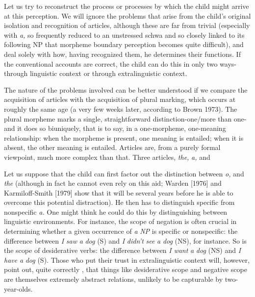Let us try to reconstruct the process or processes by which the child might arrive at this perception. We will ignore the problems that arise from the child's original isolation and recognition of articles, although these are far from trivial (especially with \textit{a,} so frequently reduced to an unstressed schwa and so closely linked to its following NP that morpheme boundary perception becomes quite difficult), and deal solely with how, having recognized them, he determines their functions. If the conventional accounts are correct, the child can do this in only two ways-through linguistic context or through extralinguistic context.

The nature of the problems involved can be better understood if we compare the acquisition of articles with the acquisition of plural marking, which occurs at roughly the same age (a very few weeks later, according to Brown 1973). The plural morpheme marks a single, straightforward distinction-one/more than one-and it does so bi\-uniquely, that is to say, in a one-morpheme, one-meaning relationship: when the morpheme is present, one meaning is entailed; when it is absent, the other meaning is entailed. Articles are, from a purely formal viewpoint, much more complex than that. Three articles, \textit{the,} \textit{a,} and


Let us suppose that the child can first factor out the distinction between \textit{o,} and \textit{the} (although in fact he cannot even rely on this aid; Warden [1976] and Karmiloff-Smith [1979] show that it will be several years before he is able to overcome this potential distraction). He then has to distinguish specific from nonspecific \textit{a. }One might think he could do this by distinguishing between linguistic environ\-ments. For instance, the scope of negation is often crucial in determin\-ing whether a given occurrence of \textit{a} \textit{NP} is specific or nonspecific: the difference between \textit{I} \textit{saw} \textit{a} \textit{dog} (S) and \textit{I} \textit{didn't} \textit{see} \textit{a} \textit{dog} (NS), for instance. So is the scope of desiderative verbs: the difference between \textit{I} \textit{want} \textit{a} \textit{dog} (NS) and \textit{I} \textit{have} \textit{a} \textit{dog} (S). Those who put their trust in extralinguistic context will, however, point out, quite correctly , that things like desiderative scope and negative scope are themselves ex\-tremely abstract relations, unlikely to be capturable by two-year-olds.

